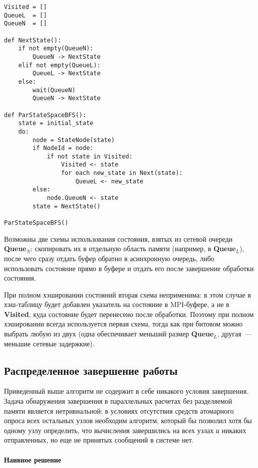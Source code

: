 \documentclass[12pt,a4paper,fleqn]{article}
\newcommand{\Code}[1]{\textbf{\mbox{#1}}}
\begin{document}
\begin{lstlisting}[style=pseudocode]
Visited = []
QueueL  = []
QueueN  = []

def NextState():
    if not empty(QueueN):
        QueueN -> NextState
    elif not empty(QueueL):
        QueueL -> NextState
    else:
        wait(QueueN)
        QueueN -> NextState

def ParStateSpaceBFS():
    state = initial_state
    do:
        node = StateNode(state)
        if NodeId = node:
            if not state in Visited:
                Visited <- state
                for each new_state in Next(state):
                    QueueL <- new_state
        else:
            node.QueueN <- state
        state = NextState()

ParStateSpaceBFS()
\end{lstlisting}

Возможны две схемы использования состояния, взятых из сетевой очереди \Code{Queue$_N$}: скопировать
их в отдельную область памяти (например, в \Code{Queue$_L$}), после чего сразу отдать буфер обратно
в асинхронную очередь, либо использовать состояние прямо в буфере и отдать его после завершение
обработки состояния.

При полном хэшировании состояний вторая схема неприменима: в этом случае в хэш-таблицу будет
добавлен указатель на состояние в MPI-буфере, а не в \Code{Visited}, куда состояние будет перенесено
после обработки. Поэтому при полном хэшировании всегда используется первая схема, тогда как при
битовом можно выбрать любую из двух (одна обеспечивает меньший размер \Code{Queue$_L$}, другая~---
меньшие сетевые задержкие).

\subsection{Распределенное завершение работы}

Приведенный выше алгоритм не содержит в себе никакого условия завершения. Задача
обнаружения завершения в параллельных расчетах без разделяемой памяти является
нетривиальной: в условиях отсутствия средств атомарного опроса всех остальных узлов
необходим алгоритм, который бы позволил хотя бы одному узлу определить, что вычисления
завершились на всех узлах \emph{и} никаких отправленных, но еще не принятых сообщений в
системе нет.

\paragraph{Наивное решение}
\end{document}
